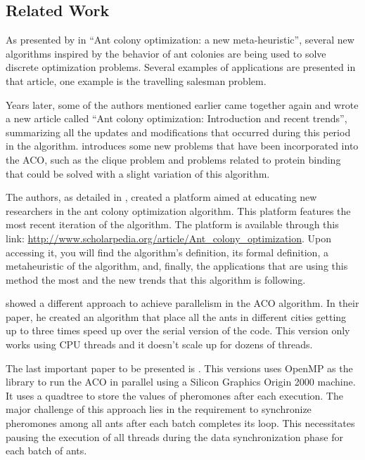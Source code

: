 \subsection{Related Work}


As presented by \cite{ACONewAlgorithm} in ``Ant colony optimization: a new meta-heuristic'', several
new algorithms inspired by the behavior of ant colonies are being used
to solve discrete optimization problems. Several
examples of applications are presented in that article, one example is
the travelling salesman problem.

Years later, some of the authors mentioned earlier came together again and
wrote a new article called ``Ant colony optimization: Introduction and recent trends'', summarizing all the updates
and modifications that occurred during this period in the algorithm. \cite{UpdatesInACO} introduces
some new problems that have been incorporated into the ACO, such as the clique problem and problems
related to protein binding that could be solved with a slight variation of this algorithm.

The authors, as detailed in \cite{ACONewAlgorithm20anos},
created a platform aimed at educating new researchers in the ant colony optimization algorithm.
This platform features the most recent iteration of the algorithm.
The platform is available through this link: \url{http://www.scholarpedia.org/article/Ant_colony_optimization}.
Upon accessing it, you will find the algorithm's definition, its formal definition, a metaheuristic
of the algorithm, and, finally, the applications that are using this method the most and the new trends
that this algorithm is following.

\cite{paralellAco} showed a different approach to achieve parallelism in the ACO algorithm.
In their paper, he created an algorithm that place all the ants in different
cities getting up to three times speed up over the serial version of the code. This version only works
using CPU threads and it doesn't scale up for dozens of threads.

The last important paper to be presented is \cite{openmpAco}. This versions uses OpenMP as the library
to run the ACO in parallel using a Silicon Graphics Origin 2000 machine.
It uses a quadtree to store the values of pheromones after each execution.
The major challenge of this approach lies in the requirement to synchronize
pheromones among all ants after each batch completes its loop. This necessitates pausing the
execution of all threads during the data synchronization phase for each batch of ants.
